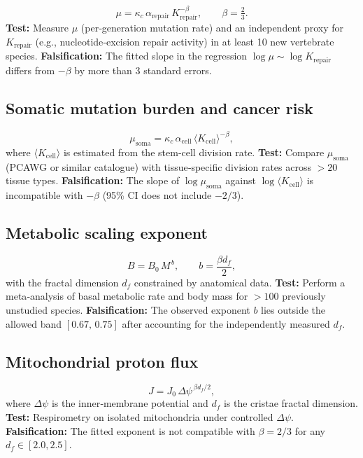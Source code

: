 \documentclass[11pt,a4paper]{article}
\begin{document}
\begin{equation}\label{eq:pred-mutation}
	\mu = \kappa_c\,\alpha_{\mathrm{repair}}\,
	K_{\mathrm{repair}}^{-\beta}, \qquad \beta = \tfrac23 .
\end{equation}
\textbf{Test:} Measure $\mu$ (per‑generation mutation rate) and
an independent proxy for $K_{\mathrm{repair}}$ (e.g., nucleotide‑excision
repair activity) in at least 10 new vertebrate species.
\textbf{Falsification:} The fitted slope in the regression
$\log\mu \sim \log K_{\mathrm{repair}}$ differs from $-\beta$ by
more than 3 standard errors.

\subsection{Somatic mutation burden and cancer risk}

\begin{equation}\label{eq:pred-somatic}
	\mu_{\mathrm{soma}} = \kappa_c\,\alpha_{\mathrm{cell}}\,
	\langle K_{\mathrm{cell}}\rangle^{-\beta},
\end{equation}
where $\langle K_{\mathrm{cell}}\rangle$ is estimated from the
stem‑cell division rate.
\textbf{Test:} Compare $\mu_{\mathrm{soma}}$ (PCAWG or similar
catalogue) with tissue‑specific division rates across $>20$
tissue types.
\textbf{Falsification:} The slope of $\log\mu_{\mathrm{soma}}$
against $\log\langle K_{\mathrm{cell}}\rangle$ is incompatible
with $-\beta$ (95\% CI does not include $-2/3$).

\subsection{Metabolic scaling exponent}

\begin{equation}\label{eq:pred-metab}
	B = B_0\,M^{\,b}, \qquad
	b = \frac{\beta d_f}{2},
\end{equation}
with the fractal dimension $d_f$ constrained by anatomical data.
\textbf{Test:} Perform a meta‑analysis of basal metabolic rate and
body mass for $>100$ previously unstudied species.
\textbf{Falsification:} The observed exponent $b$ lies outside the
allowed band $[0.67,\,0.75]$ after accounting for the independently
measured $d_f$.

\subsection{Mitochondrial proton flux}

\begin{equation}\label{eq:pred-mito}
	J = J_0\,\Delta\psi^{\,\beta d_f/2},
\end{equation}
where $\Delta\psi$ is the inner‑membrane potential and $d_f$ is
the cristae fractal dimension.
\textbf{Test:} Respirometry on isolated mitochondria under
controlled $\Delta\psi$.
\textbf{Falsification:} The fitted exponent is not compatible
with $\beta=2/3$ for any $d_f\in[2.0,2.5]$.
\end{document}
